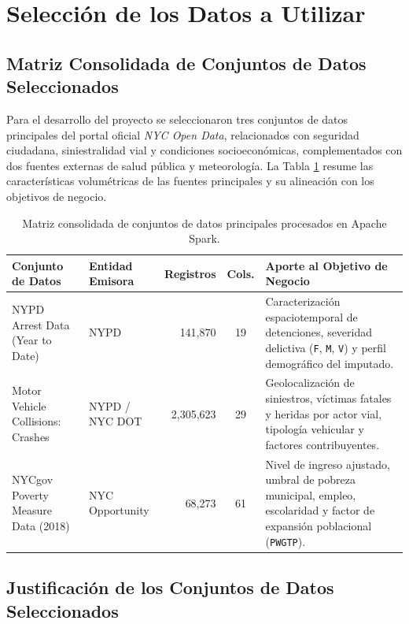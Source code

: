 \section{Selección de los Datos a Utilizar}
\label{sec:seleccion_datos}

\subsection{Matriz Consolidada de Conjuntos de Datos Seleccionados}

Para el desarrollo del proyecto se seleccionaron tres conjuntos de datos principales del portal oficial \textit{NYC Open Data}, relacionados con seguridad ciudadana, siniestralidad vial y condiciones socioeconómicas, complementados con dos fuentes externas de salud pública y meteorología. La Tabla \ref{tab:seleccion_datos} resume las características volumétricas de las fuentes principales y su alineación con los objetivos de negocio.

\begin{table}[H]
\centering
\small
\renewcommand{\arraystretch}{1.25}
\begin{tabularx}{\textwidth}{p{4.2cm} p{2.8cm} r c X}
\toprule
\textbf{Conjunto de Datos} & \textbf{Entidad Emisora} & \textbf{Registros} & \textbf{Cols.} & \textbf{Aporte al Objetivo de Negocio} \\
\midrule
NYPD Arrest Data (Year to Date) & NYPD & 141,870 & 19 & Caracterización espaciotemporal de detenciones, severidad delictiva (\texttt{F}, \texttt{M}, \texttt{V}) y perfil demográfico del imputado. \\
Motor Vehicle Collisions: Crashes & NYPD / NYC DOT & 2,305,623 & 29 & Geolocalización de siniestros, víctimas fatales y heridas por actor vial, tipología vehicular y factores contribuyentes. \\
NYCgov Poverty Measure Data (2018) & NYC Opportunity & 68,273 & 61 & Nivel de ingreso ajustado, umbral de pobreza municipal, empleo, escolaridad y factor de expansión poblacional (\texttt{PWGTP}). \\
\bottomrule
\end{tabularx}
\caption{Matriz consolidada de conjuntos de datos principales procesados en Apache Spark.}
\label{tab:seleccion_datos}
\end{table}

\subsection{Justificación de los Conjuntos de Datos Seleccionados}

